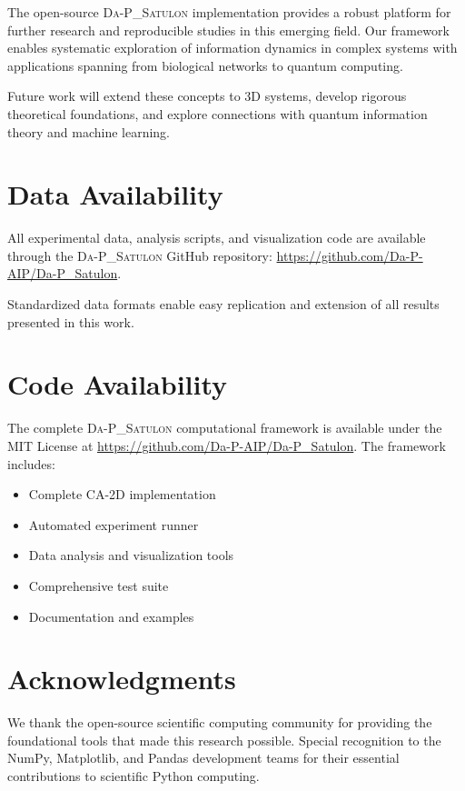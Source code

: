 \documentclass[twocolumn,showpacs,preprintnumbers,amsmath,amssymb,prb]{revtex4-2}
\newcommand{\satulon}{\textsc{Da-P\_Satulon}}
\begin{document}
The open-source \satulon{} implementation provides a robust platform for further research and reproducible studies in this emerging field. Our framework enables systematic exploration of information dynamics in complex systems with applications spanning from biological networks to quantum computing.

Future work will extend these concepts to 3D systems, develop rigorous theoretical foundations, and explore connections with quantum information theory and machine learning.

\section*{Data Availability}
\label{sec:data}

All experimental data, analysis scripts, and visualization code are available through the \satulon{} GitHub repository: \url{https://github.com/Da-P-AIP/Da-P_Satulon}. 

Standardized data formats enable easy replication and extension of all results presented in this work.

\section*{Code Availability}
\label{sec:code}

The complete \satulon{} computational framework is available under the MIT License at \url{https://github.com/Da-P-AIP/Da-P_Satulon}. The framework includes:
\begin{itemize}
\item Complete CA-2D implementation
\item Automated experiment runner
\item Data analysis and visualization tools
\item Comprehensive test suite
\item Documentation and examples
\end{itemize}

\section*{Acknowledgments}
\label{sec:acknowledgments}

We thank the open-source scientific computing community for providing the foundational tools that made this research possible. Special recognition to the NumPy, Matplotlib, and Pandas development teams for their essential contributions to scientific Python computing.
\end{document}
